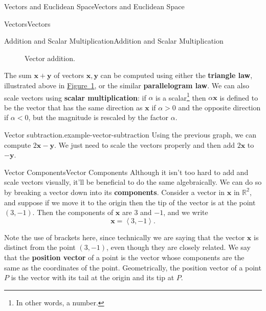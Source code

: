 \documentclass[10pt,]{book}
\newcommand{\terminology}[1]{\textbf{#1}}
\numberwithin{equation}{section}
\newcommand{\RR}{\mathbb{R}}
\newcommand{\vv}[1]{\mathbf{#1}}
\newcommand{\dotprod}[1]{\left\langle #1 \right\rangle}
\begin{document}
\begin{chapterptx}{Vectors and Euclidean Space}{}{Vectors and Euclidean Space}{}{}
\begin{sectionptx}{Vectors}{}{Vectors}{}{}
\begin{subsectionptx}{Addition and Scalar Multiplication}{}{Addition and Scalar Multiplication}{}{}
\begin{figure}
{
}
\caption{Vector addition.\label{figure-vector-addition}}
\end{figure}
\hypertarget{p-869}{}%
The sum \(\vv{x}+\vv{y}\) of vectors \(\vv{x},\vv{y}\) can be computed using either the \terminology{triangle law}, illustrated above in \hyperref[figure-vector-addition]{Figure~\ref{figure-vector-addition}}, or the similar \terminology{parallelogram law}. We can also scale vectors using \terminology{scalar multiplication}: if \(\alpha\) is a scalar\footnote{In other words, a number.\label{fn-2}} then \(\alpha\vv{x}\) is defined to be the vector that has the same direction as \(\vv{x}\) if \(\alpha>0\) and the opposite direction if \(\alpha<0\), but the magnitude is rescaled by the factor \(\alpha\).%
\begin{example}{Vector subtraction.}{example-vector-subtraction}%
\hypertarget{p-870}{}%
Using the previous graph, we can compute \(2\vv{x}-\vv{y}\). We just need to scale the vectors properly and then add \(2\vv{x}\) to \(-\vv{y}\).%
\end{example}
\end{subsectionptx}
%
%
\typeout{************************************************}
\typeout{************************************************}
%
\begin{subsectionptx}{Vector Components}{}{Vector Components}{}{}\label{subsection-vector-components}
\hypertarget{p-871}{}%
Although it isn't too hard to add and scale vectors visually, it'll be beneficial to do the same algebraically. We can do so by breaking a vector down into its \terminology{components}. Consider a vector in \(\vv{x}\) in \(\RR^{2}\), and suppose if we move it to the origin then the tip of the vector is at the point \((3,-1)\). Then the components of \(\vv{x}\) are \(3\) and \(-1\), and we write%
\begin{equation*}
\vv{x} = \dotprod{3,-1}.
\end{equation*}
%
\par
\hypertarget{p-872}{}%
Note the use of brackets here, since technically we are saying that the vector \(\vv{x}\) is distinct from the point \((3,-1)\), even though they are closely related. We say that the \terminology{position vector} of a point is the vector whose components are the same as the coordinates of the point. Geometrically, the position vector of a point \(P\) is the vector with its tail at the origin and its tip at \(P\).%

\end{subsectionptx}
\end{sectionptx}
\end{chapterptx}
\end{document}
